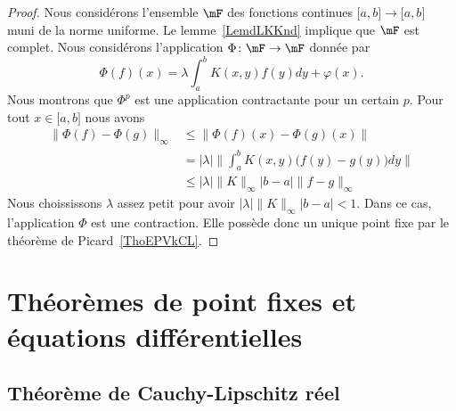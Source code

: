 \begin{proof}
	Nous considérons l'ensemble \( \mF\) des fonctions continues \( \mathopen[ a , b \mathclose]\to\mathopen[ a , b \mathclose]\) muni de la norme uniforme. Le lemme~\ref{LemdLKKnd} implique que \( \mF\) est complet. Nous considérons l'application \( \Phi\colon \mF\to \mF\) donnée par
	\begin{equation}
		\Phi(f)(x)=\lambda\int_a^bK(x,y)f(y)dy+\varphi(x).
	\end{equation}
	Nous montrons que \( \Phi^p\) est une application contractante pour un certain \( p\). Pour tout \( x\in \mathopen[ a , b \mathclose]\) nous avons
	\begin{subequations}
		\begin{align}
			\| \Phi(f)-\Phi(g) \|_{\infty} & \leq \| \Phi(f)(x)-\Phi(g)(x) \|                                    \\
			                               & =   | \lambda |\Big\| \int_a^bK(x,y)\big( f(y)-g(y) \big)dy  \Big\| \\
			                               & \leq  | \lambda |\| K \|_{\infty}| b-a |\| f-g \|_{\infty}
		\end{align}
	\end{subequations}
	Nous choississons \( \lambda\) assez petit pour avoir \( | \lambda |\| K \|_{\infty}| b-a |<1\). Dans ce cas, l'application \( \Phi\) est une contraction. Elle possède donc un unique point fixe par le théorème de Picard~\ref{ThoEPVkCL}.
\end{proof}

\section{Théorèmes de point fixes et équations différentielles}

\subsection{Théorème de Cauchy-Lipschitz réel}

